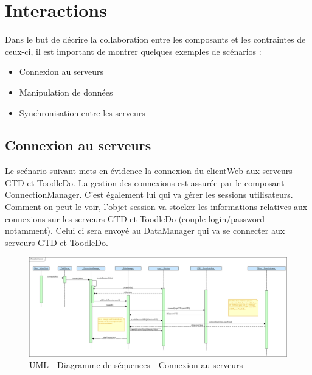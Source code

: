 \chapter{Interactions}


Dans le but de décrire la collaboration entre les composants et les contraintes de ceux-ci, il est important de montrer quelques exemples de scénarios : \\

\begin{itemize}
\item Connexion au serveurs
\item Manipulation de données 
\item Synchronisation entre les serveurs
\end{itemize}


\section{Connexion au serveurs}


Le scénario suivant mets en évidence la connexion du clientWeb aux serveurs GTD et ToodleDo. La gestion des connexions est assurée par le composant ConnectionManager. C'est également lui qui va gérer les sessions utilisateurs. Comment on peut le voir, l'objet session va stocker les informations relatives aux connexions sur les serveurs GTD et ToodleDo (couple login/password notamment). Celui ci sera envoyé au DataManager qui va se connecter aux serveurs GTD et ToodleDo.


\begin{figure}[H]
  \begin{center}
  \includegraphics[scale=0.4,angle=90]{livrable3/images/connection.png}
  \caption{UML - Diagramme de séquences - Connexion au serveurs}
  \end{center}
\end{figure}



